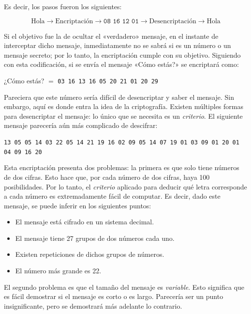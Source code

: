 \documentclass[12pt,a4paper,twoside]{book}
\begin{document}
Es decir, los pasos fueron los siguientes:

\[
\text{Hola} \rightarrow \text{Encriptación} \rightarrow \texttt{08 16 12 01} \rightarrow \text{Desencriptación} \rightarrow \text{Hola}
\]

Si el objetivo fue la de ocultar el «verdadero» mensaje, en el instante de interceptar dicho mensaje, inmediatamente no se sabrá si es un número o un mensaje secreto; por lo tanto, la encriptación cumple con su objetivo. Siguiendo con esta codificación, si se envía el mensaje «Cómo estás?» se encriptará como:

\begin{center}
¿Cómo estás? $ = $ \texttt{03 16 13 16   05 20 21 01 20 29}
\end{center}

Pareciera que este número sería difícil de desencriptar y saber el mensaje. Sin embargo, aquí es donde entra la idea de la criptografía. Existen múltiples formas para desencriptar el mensaje: lo único que se necesita es un \textit{criterio}. El siguiente mensaje parecería aún más complicado de descifrar:

\begin{center}
{\small \texttt{13 05 05 14 03 22 05 14 21 19 16 02 09 05 14 07 19 01 03 09 01 20 01 04 09 16 20}}
\end{center}

Esta encriptación presenta dos problemas: la primera es que solo tiene números de dos cifras. Esto hace que, por cada número de dos cifras, haya 100 posibilidades. Por lo tanto, el \textit{criterio} aplicado para deducir qué letra corresponde a cada número es extremadamente fácil de computar. Es decir, dado este mensaje, se puede inferir en los siguientes puntos:

\begin{itemize}
\item El mensaje está cifrado en un sistema decimal.
\item El mensaje tiene 27 grupos de dos números cada uno.
\item Existen repeticiones de dichos grupos de números.
\item El número más grande es 22.
\end{itemize}

El segundo problema es que el tamaño del mensaje es \textit{variable}. Esto significa que es fácil demostrar si el mensaje es corto o es largo. Parecería ser un punto insignificante, pero se demostrará más adelante lo contrario.
\end{document}
